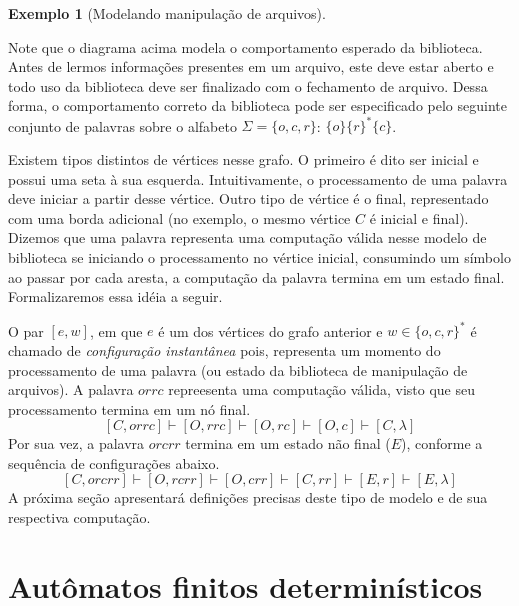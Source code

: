 \documentclass[a4paper]{article}
\theoremstyle{definition}
\newtheorem{Example}{Exemplo}
\begin{document}
\begin{Example}[Modelando manipulação de arquivos]
\begin{figure}[ht]
      \centering      
    \end{figure}
    Note que o diagrama acima modela o comportamento esperado da biblioteca.
    Antes de lermos informações presentes em um arquivo, este deve estar
    aberto e todo uso da biblioteca deve ser finalizado com o fechamento
    de arquivo. Dessa forma, o comportamento correto da biblioteca pode
    ser especificado pelo seguinte conjunto de palavras sobre o alfabeto
    $\Sigma=\{o,c,r\}$: $\{o\}\{r\}^*\{c\}$.

    Existem tipos distintos de vértices nesse grafo. O primeiro é dito ser
    inicial e possui uma seta à sua esquerda. Intuitivamente, o processamento
    de uma palavra deve iniciar a partir desse vértice. Outro tipo de vértice é
    o final, representado com uma borda adicional (no exemplo, o mesmo vértice
    $C$ é inicial e final). Dizemos que uma palavra representa uma computação
    válida nesse modelo de biblioteca se iniciando o processamento no vértice
    inicial, consumindo um símbolo ao passar por cada aresta, a computação da
    palavra termina em um estado final. Formalizaremos essa idéia a seguir.

    O par $[e,w]$, em que $e$ é um dos vértices do grafo anterior e
    $w\in\{o,c,r\}^*$ é chamado de \emph{configuração instantânea} pois,
    representa um momento do processamento de uma palavra (ou estado da
    biblioteca de manipulação de arquivos). A palavra $orrc$
    repreesenta uma computação válida, visto que seu processamento termina
    em um nó final.
    \[
      [C,orrc] \vdash [O,rrc] \vdash [O,rc] \vdash [O,c] \vdash [C,\lambda] 
    \]
    Por sua vez, a palavra $orcrr$ termina em um estado não final ($E$),
    conforme a sequência de configurações abaixo.
    \[
      [C,orcrr] \vdash [O,rcrr] \vdash [O,crr] \vdash [C,rr] \vdash [E, r]
      \vdash [E,\lambda] 
    \]
    A próxima seção apresentará definições precisas deste tipo de modelo e
    de sua respectiva computação.
  \end{Example}
  
  \section{Autômatos finitos determinísticos}
\end{document}
